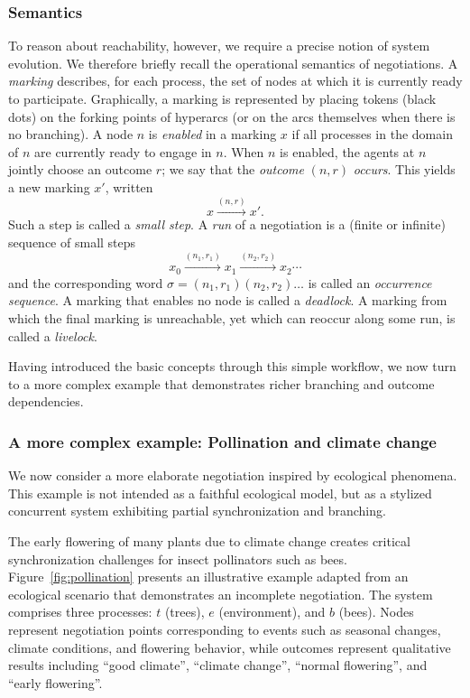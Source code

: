 \subsubsection{Semantics}
To reason about reachability, however, we require a precise notion of system evolution. We therefore briefly recall the operational semantics of negotiations. A \emph{marking} describes, for each process, the set of nodes at which it is currently ready to participate. Graphically, a marking is represented by placing tokens (black dots) on the forking points of hyperarcs (or on the arcs themselves when there is no branching). A node \(n\) is \emph{enabled} in a marking \(x\) if all processes in the domain of \(n\) are currently ready to engage in \(n\). When \(n\) is enabled, the agents at \(n\) jointly choose an outcome \(r\); we say that the \emph{outcome} \((n,r)\) \emph{occurs}. This yields a new marking \(x'\), written
\[
x \xrightarrow{(n,r)} x'.
\]
Such a step is called a \emph{small step}. A \emph{run} of a negotiation is a (finite or infinite) sequence of small steps
\[
x_0 \xrightarrow{(n_1,r_1)} x_1 \xrightarrow{(n_2,r_2)} x_2 \cdots
\]
and the corresponding word \(\sigma = (n_1,r_1)(n_2,r_2)\dots\) is called an \emph{occurrence sequence}. A marking that enables no node is called a \emph{deadlock}. A marking from which the final marking is unreachable, yet which can reoccur along some run, is called a \emph{livelock}.

Having introduced the basic concepts through this simple workflow, we now turn to a more complex example that demonstrates richer branching and outcome dependencies.

\subsubsection{A more complex example: Pollination and climate change}
\label{subsubsec:pollination-example}

We now consider a more elaborate negotiation inspired by ecological phenomena. This example is not intended as a faithful ecological model, but as a stylized concurrent system exhibiting partial synchronization and branching. 

The early flowering of many plants due to climate change creates critical synchronization challenges for insect pollinators such as bees. Figure~\ref{fig:pollination} presents an illustrative example adapted from an ecological scenario that demonstrates an incomplete negotiation. The system comprises three processes: \(t\) (trees), \(e\) (environment), and \(b\) (bees). Nodes represent negotiation points corresponding to events such as seasonal changes, climate conditions, and flowering behavior, while outcomes represent qualitative results including ``good climate'', ``climate change'', ``normal flowering'', and ``early flowering''.

